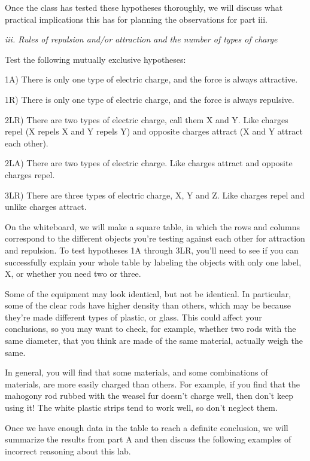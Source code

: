 Once the class has tested these hypotheses thoroughly,
we will discuss what practical implications this has for
planning the observations for part iii.

\emph{iii. Rules of repulsion and/or attraction and the
number of types of charge}

Test the following mutually exclusive hypotheses:

1A) There is only one type of electric charge, and the force
is always attractive.

1R) There is only one type of electric charge, and the force
is always repulsive.

2LR) There are two types of electric charge, call them X
and Y. Like charges repel (X repels X and Y repels Y)
and opposite charges attract (X and Y attract each other).

2LA) There are two types of electric charge. Like charges
attract and opposite charges repel.

3LR) There are three types of electric charge, X, Y and
Z. Like charges repel and unlike charges attract.

On the whiteboard, we will
make a square table, in which the rows and columns correspond
to the different objects you're testing against each other
for attraction and repulsion. To test hypotheses 1A through 3LR, you'll
need to see if you can successfully explain your whole
table by labeling the objects with only one label, X,
or whether you need two or three.

Some of the equipment may look identical, but not be identical.
In particular, some of the clear rods have higher density than
others, which may be because they're made different types of plastic,
or glass. This could affect your conclusions, so you may want to
check, for example, whether two rods with the same diameter,
that you think are made of
the same material, actually weigh the same.

In general, you will find that some materials, and some combinations
of materials, are more easily charg\-ed than others. For example, if
you find that the mahogony rod rubbed with the weasel fur doesn't
charge well, then don't keep using it! The white plastic strips
tend to work well, so don't neglect them.

Once we have enough data in the table to reach a definite conclusion,
we will summarize the results from part A and then
discuss the following examples of incorrect reasoning about this
lab. 

